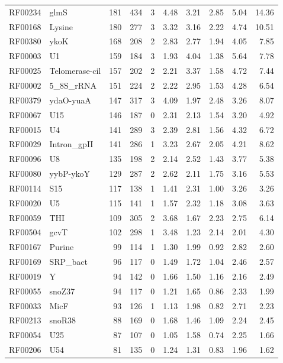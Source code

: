 \documentclass[11pt]{article}
\begin{document}
\begin{table}
\begin{center}
\begin{tabular}{|ll|rrr|rr|rr|r|}
RF00234 & glmS & 181 & 434 & 3 & 4.48 & 3.21 & 2.85 & 5.04 & 14.36 \\  
RF00168 & Lysine & 180 & 277 & 3 & 3.32 & 3.16 & 2.22 & 4.74 & 10.51 \\  
RF00380 & ykoK & 168 & 208 & 2 & 2.83 & 2.77 & 1.94 & 4.05 & 7.85 \\  
RF00003 & U1 & 159 & 184 & 3 & 1.93 & 4.04 & 1.38 & 5.64 & 7.78 \\  
RF00025 & Telomerase-cil & 157 & 202 & 2 & 2.21 & 3.37 & 1.58 & 4.72 & 7.44 \\  
RF00002 & 5\_8S\_rRNA & 151 & 224 & 2 & 2.22 & 2.95 & 1.53 & 4.28 & 6.54 \\  
RF00379 & ydaO-yuaA & 147 & 317 & 3 & 4.09 & 1.97 & 2.48 & 3.26 & 8.07 \\  
RF00067 & U15 & 146 & 187 & 0 & 2.31 & 2.13 & 1.54 & 3.20 & 4.92 \\  
RF00015 & U4 & 141 & 289 & 3 & 2.39 & 2.81 & 1.56 & 4.32 & 6.72 \\  
RF00029 & Intron\_gpII & 141 & 286 & 1 & 3.23 & 2.67 & 2.05 & 4.21 & 8.62 \\  
RF00096 & U8 & 135 & 198 & 2 & 2.14 & 2.52 & 1.43 & 3.77 & 5.38 \\  
RF00080 & yybP-ykoY & 129 & 287 & 2 & 2.62 & 2.11 & 1.75 & 3.16 & 5.53 \\  
RF00114 & S15 & 117 & 138 & 1 & 1.41 & 2.31 & 1.00 & 3.26 & 3.26 \\  
RF00020 & U5 & 115 & 141 & 1 & 1.57 & 2.32 & 1.18 & 3.08 & 3.63 \\  
RF00059 & THI & 109 & 305 & 2 & 3.68 & 1.67 & 2.23 & 2.75 & 6.14 \\  
RF00504 & gcvT & 102 & 298 & 1 & 3.48 & 1.23 & 2.14 & 2.01 & 4.30 \\  
RF00167 & Purine & 99 & 114 & 1 & 1.30 & 1.99 & 0.92 & 2.82 & 2.60 \\  
RF00169 & SRP\_bact & 96 & 117 & 0 & 1.49 & 1.72 & 1.04 & 2.46 & 2.57 \\  
RF00019 & Y & 94 & 142 & 0 & 1.66 & 1.50 & 1.16 & 2.16 & 2.49 \\  
RF00055 & snoZ37 & 94 & 117 & 0 & 1.21 & 1.65 & 0.86 & 2.33 & 1.99 \\  
RF00033 & MicF & 93 & 126 & 1 & 1.13 & 1.98 & 0.82 & 2.71 & 2.23 \\  
RF00213 & snoR38 & 88 & 169 & 0 & 1.68 & 1.46 & 1.09 & 2.24 & 2.45 \\  
RF00054 & U25 & 87 & 107 & 0 & 1.05 & 1.58 & 0.74 & 2.25 & 1.66 \\  
RF00206 & U54 & 81 & 135 & 0 & 1.24 & 1.31 & 0.83 & 1.96 & 1.62 \\  

\end{tabular}
\end{center}
\end{table}
\end{document}
